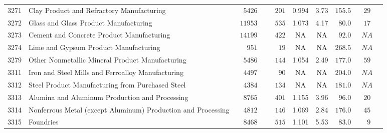 \documentclass[9pt, oneside]{article}   	%
\begin{document}
\begin{longtable}{lp{3 in}ccccccc}
3271  & Clay Product and Refractory Manufacturing & $\phantom{00}5426$ & $\phantom{000}201$ & 0.994 &  3.73 & $155.5$ & $\phantom{0}29$ \\
3272  & Glass and Glass Product Manufacturing & $\phantom{0}11953$ & $\phantom{000}535$ & 1.073 &  4.17 & $\phantom{0}80.0$ & $\phantom{0}17$ \\
3273  & Cement and Concrete Product Manufacturing & $\phantom{0}14199$ & $\phantom{000}422$ &    NA &    NA & $\phantom{0}92.0$ & $\phantom{0}NA$ \\
3274  & Lime and Gypsum Product Manufacturing & $\phantom{000}951$ & $\phantom{0000}19$ &    NA &    NA & $268.5$ & $\phantom{0}NA$ \\
3279  & Other Nonmetallic Mineral Product Manufacturing & $\phantom{00}5486$ & $\phantom{000}144$ & 1.054 &  2.49 & $177.0$ & $\phantom{0}59$ \\
3311  & Iron and Steel Mills and Ferroalloy Manufacturing & $\phantom{00}4497$ & $\phantom{0000}90$ &    NA &    NA & $204.0$ & $\phantom{0}NA$ \\
3312  & Steel Product Manufacturing from Purchased Steel & $\phantom{00}4384$ & $\phantom{000}134$ &    NA &    NA & $181.0$ & $\phantom{0}NA$ \\
3313  & Alumina and Aluminum Production and Processing & $\phantom{00}8765$ & $\phantom{000}401$ & 1.155 &  3.96 & $\phantom{0}96.0$ & $\phantom{0}20$ \\
3314  & Nonferrous Metal (except Aluminum) Production and Processing & $\phantom{00}4812$ & $\phantom{000}146$ & 1.069 &  2.84 & $176.0$ & $\phantom{0}45$ \\
3315  & Foundries & $\phantom{00}8468$ & $\phantom{000}515$ & 1.101 &  5.53 & $\phantom{0}83.0$ & $\phantom{00}9$ \\


\end{longtable}
\end{document}
